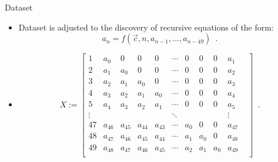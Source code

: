 \documentclass[t,usenames,dvipsnames]{beamer} %
\newcommand{\1}{\boldsymbol{1}}
\newcommand{\0}{\boldsymbol{0}}
\begin{document}
 \begin{frame}{Dataset}

     \begin{itemize}
         \item Dataset is adjusted to the discovery of recursive equations of the form:
         $$ a_n = f(\vec{c}, n, a_{n-1}, ..., a_{n-49}) \enspace.  $$
         \item \[
 X :=
 \left[ 
 \begin{array}{ccccccccccccccccccccccccccccccccccccccccccccccccccc}
 1 & a_{0} & 0 & 0 & 0 & \cdots & 0 & 0 & 0 & a_{1} &  \\
 2 & a_{1} & a_{0} & 0 & 0 & \cdots & 0 & 0 & 0 & a_{2} &  \\
 3 & a_{2} & a_{1} & a_{0} & 0 & \cdots & 0 & 0 & 0 & a_{3} &  \\
 4 & a_{3} & a_{2} & a_{1} & a_{0} & \cdots & 0 & 0 & 0 & a_{4} &  \\
 5 & a_{4} & a_{3} & a_{2} & a_{1} & \cdots & 0 & 0 & 0 & a_{5} &  \\
 \vdots & & & & & \ddots  & & & & \vdots \\
 47 & a_{46} & a_{45} & a_{44} & a_{43} & \cdots & a_{0} & 0 & 0 & a_{47} &  \\
 48 & a_{47} & a_{46} & a_{45} & a_{44} & \cdots & a_{1} & a_{0} & 0 & a_{48} &  \\
 49 & a_{48} & a_{47} & a_{46} & a_{45} & \cdots & a_{2} & a_{1} & a_{0} & a_{49} &  \\
 \end{array}
 \right] \enspace.
 \]
     \end{itemize}
    
 \end{frame}
\end{document}
